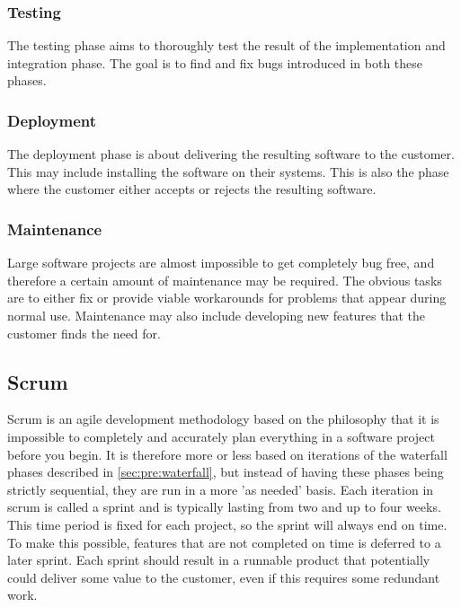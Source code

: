 \subsubsection{Testing}
The testing phase aims to thoroughly test the result of the implementation and
integration phase. The goal is to find and fix bugs introduced in both these
phases.

\subsubsection{Deployment}
The deployment phase is about delivering the resulting software to the
customer. This may include installing the software on their systems. This is
also the phase where the customer either accepts or rejects the resulting
software.

\subsubsection{Maintenance}
Large software projects are almost impossible to get completely bug free, and
therefore a certain amount of maintenance may be required. The obvious tasks
are to either fix or provide viable workarounds for problems that appear during
normal use. Maintenance may also include developing new features that the
customer finds the need for.

\subsection{Scrum}
Scrum is an agile development methodology based on the philosophy that it is
impossible to completely and accurately plan everything in a software project
before you begin. It is therefore more or less based on iterations of the
waterfall phases described in \autoref{sec:pre:waterfall}, but instead of
having these phases being strictly sequential, they are run in a more
'as needed' basis. Each iteration in scrum is called a sprint and is typically
lasting from two and up to four weeks. This time period is fixed for each
project, so the sprint will always end on time. To make this possible, features
that are not completed on time is deferred to a later sprint. Each sprint
should result in a runnable product that potentially could deliver some value
to the customer, even if this requires some redundant work.

